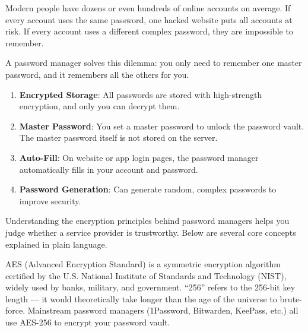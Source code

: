 


Modern people have dozens or even hundreds of online accounts on average. If every account uses the same password, one hacked website puts all accounts at risk. If every account uses a different complex password, they are impossible to remember.

A password manager solves this dilemma: you only need to remember one master password, and it remembers all the others for you.


\begin{enumerate}
  \item \textbf{Encrypted Storage}: All passwords are stored with high-strength encryption, and only you can decrypt them.
  \item \textbf{Master Password}: You set a master password to unlock the password vault. The master password itself is not stored on the server.
  \item \textbf{Auto-Fill}: On website or app login pages, the password manager automatically fills in your account and password.
  \item \textbf{Password Generation}: Can generate random, complex passwords to improve security.
\end{enumerate}


Understanding the encryption principles behind password managers helps you judge whether a service provider is trustworthy. Below are several core concepts explained in plain language.


AES (Advanced Encryption Standard) is a symmetric encryption algorithm certified by the U.S. National Institute of Standards and Technology (NIST), widely used by banks, military, and government. “256” refers to the 256-bit key length — it would theoretically take longer than the age of the universe to brute-force. Mainstream password managers (1Password, Bitwarden, KeePass, etc.) all use AES-256 to encrypt your password vault.

